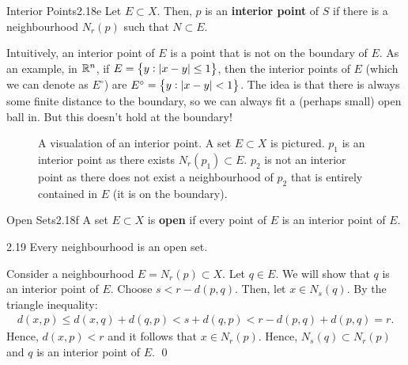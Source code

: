 \begin{definition}{Interior Points}{2.18e}
    Let $E \subset X$. Then, $p$ is an \textbf{interior point} of $S$ if there is a neighbourhood $N_r(p)$ such that $N \subset E$. 
\end{definition}
\noindent Intuitively, an interior point of $E$ is a point that is not on the boundary of $E$. As an example, in $\mathbb{R}^n$, if $E = \set{y: \abs{x - y} \leq 1}$, then the interior points of $E$ (which we can denote as $E^\circ$) are $E^\circ = \set{y: \abs{x - y} < 1}$. The idea is that there is always some finite distance to the boundary, so we can always fit a (perhaps small) open ball in. But this doesn't hold at the boundary!
\begin{figure}[htbp]
    \centering
    \caption{A visualation of an interior point. A set $E \subset X$ is pictured. $p_1$ is an interior point as there exists $N_r(p_1) \subset E$. $p_2$ is not an interior point as there does not exist a neighbourhood of $p_2$ that is entirely contained in $E$ (it is on the boundary). }
    \label{fig6}
\end{figure}

\newpage 
\setcounter{rudin}{17}
\begin{definition}{Open Sets}{2.18f}
    A set $E \subset X$ is \textbf{open} if every point of $E$ is an interior point of $E$. 
\end{definition}

\begin{theorem}{}{2.19}
    Every neighbourhood is an open set.
\end{theorem}
\begin{nproof}
    Consider a neighbourhood $E = N_r(p) \subset X$. Let $q \in E$. We will show that $q$ is an interior point of $E$. Choose $s < r - d(p, q)$. Then, let $x \in N_s(q)$. By the triangle inequality:
    \begin{align*}
        d(x, p) \leq d(x, q) + d(q, p) < s + d(q, p) < r - d(p, q) + d(p, q) = r.
    \end{align*}
    Hence, $d(x, p) < r$ and it follows that $x \in N_r(p)$. Hence, $N_s(q) \subset N_r(p)$ and $q$ is an interior point of $E$. \qed
\end{nproof}

